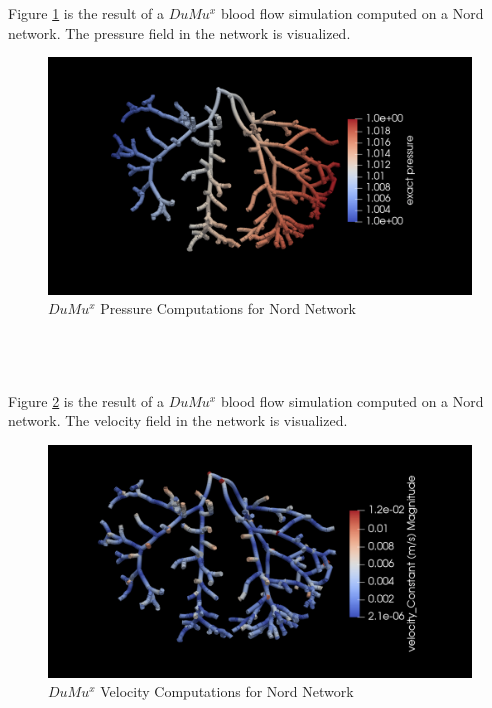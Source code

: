 Figure \ref{fig:nord_pressure}  is the result of a $DuMu^x$ blood flow simulation computed on a Nord network. The pressure field in the network is visualized.\\
\begin{figure}[h]
\centering
\includegraphics[width=162mm]{nord_pressure}
\caption{\footnotesize $DuMu^x$ Pressure Computations for Nord Network}
\label{fig:nord_pressure}
\end{figure}\\\\
%
\\Figure \ref{fig:nord_velocity}  is the result of a $DuMu^x$ blood flow simulation computed on a Nord network. The velocity field in the network is visualized.\\
\begin{figure}[h]
\centering
\includegraphics[width=162mm]{nord_velocity}
\caption{\footnotesize $DuMu^x$ Velocity Computations for Nord Network}
\label{fig:nord_velocity}
\end{figure}\\\\

